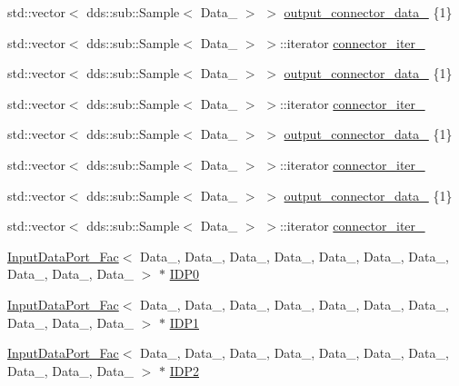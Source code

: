 \begin{DoxyCompactItemize}
std\+::vector$<$ dds\+::sub\+::\+Sample$<$ Data\+\_ $>$ $>$ \hyperlink{classFactory_a9f636cd7fe32df0bd19e4ec9490d5ccd}{output\+\_\+connector\+\_\+data\+\_} \{1\}
\item 
std\+::vector$<$ dds\+::sub\+::\+Sample$<$ Data\+\_ $>$ $>$\+::iterator \hyperlink{classFactory_acb10615bebab1e5eda677a8b41c0fd29}{connector\+\_\+iter\+\_}
\item 
std\+::vector$<$ dds\+::sub\+::\+Sample$<$ Data\+\_ $>$ $>$ \hyperlink{classFactory_acb470e6e5293ed45c2a1284015b8a63f}{output\+\_\+connector\+\_\+data\+\_} \{1\}
\item 
std\+::vector$<$ dds\+::sub\+::\+Sample$<$ Data\+\_ $>$ $>$\+::iterator \hyperlink{classFactory_abe759623a3ab82ecd6ae3923629c397d}{connector\+\_\+iter\+\_}
\item 
std\+::vector$<$ dds\+::sub\+::\+Sample$<$ Data\+\_ $>$ $>$ \hyperlink{classFactory_add95efaac04f798e826ac10668d38e48}{output\+\_\+connector\+\_\+data\+\_} \{1\}
\item 
std\+::vector$<$ dds\+::sub\+::\+Sample$<$ Data\+\_ $>$ $>$\+::iterator \hyperlink{classFactory_aa664c801aed2472266996c3e3256c406}{connector\+\_\+iter\+\_}
\item 
std\+::vector$<$ dds\+::sub\+::\+Sample$<$ Data\+\_ $>$ $>$ \hyperlink{classFactory_ae8ed17f677db9e6c55b3f75379baf818}{output\+\_\+connector\+\_\+data\+\_} \{1\}
\item 
std\+::vector$<$ dds\+::sub\+::\+Sample$<$ Data\+\_ $>$ $>$\+::iterator \hyperlink{classFactory_addefc1a08fde4845b9d68bd9c0743f94}{connector\+\_\+iter\+\_}
\item 
\hyperlink{classInputDataPort__Fac}{Input\+Data\+Port\+\_\+\+Fac}$<$ Data\+\_, Data\+\_, Data\+\_, Data\+\_, Data\+\_, Data\+\_, Data\+\_, Data\+\_, Data\+\_, Data\+\_ $>$ $\ast$ \hyperlink{classFactory_ae0d8f03ec007e2da61fbc59840193256}{I\+D\+P0}
\item 
\hyperlink{classInputDataPort__Fac}{Input\+Data\+Port\+\_\+\+Fac}$<$ Data\+\_, Data\+\_, Data\+\_, Data\+\_, Data\+\_, Data\+\_, Data\+\_, Data\+\_, Data\+\_, Data\+\_ $>$ $\ast$ \hyperlink{classFactory_a52571611c058145431671afaedee6db3}{I\+D\+P1}
\item 
\hyperlink{classInputDataPort__Fac}{Input\+Data\+Port\+\_\+\+Fac}$<$ Data\+\_, Data\+\_, Data\+\_, Data\+\_, Data\+\_, Data\+\_, Data\+\_, Data\+\_, Data\+\_, Data\+\_ $>$ $\ast$ \hyperlink{classFactory_a41dabc989ec1d1e8889e94627b73d4c7}{I\+D\+P2}

\end{DoxyCompactItemize}

